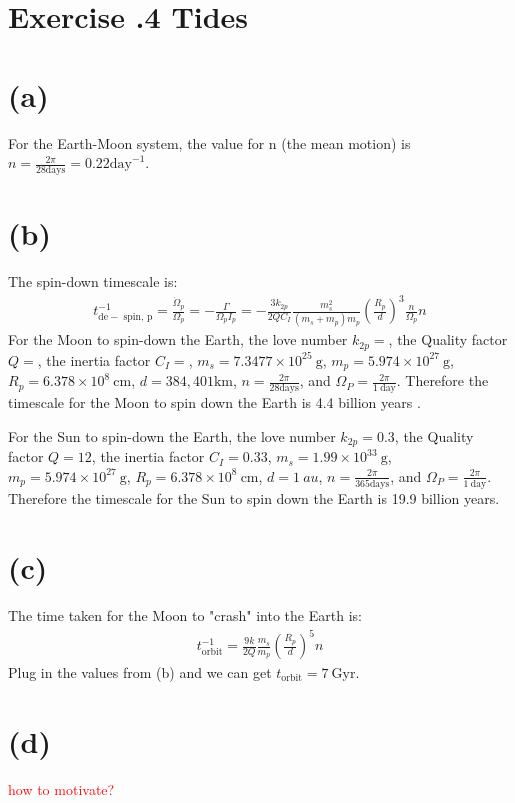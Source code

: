 \documentclass[a4paper,12pt]{article}
\newcommand{\cm}{\mathrm{cm}}
\newcommand{\g}{\mathrm{g}}
\begin{document}
\section*{\textbf{Exercise \uppercase\expandafter{}.4 Tides}}
\section*{(a)}
For the Earth-Moon system, the value for n (the mean motion) is $n = \frac{2\pi}{28 \text{days}} = 0.22 \text{day}^{-1}$.

\section*{(b)}
The spin-down timescale is:
\begin{align*}
    t_{\mathrm{de}-\text { spin, } \mathrm{p}}^{-1}=\frac{\dot{\Omega}_p}{\Omega_p}=-\frac{\Gamma}{\Omega_p I_p}=-\frac{3 k_{2 p}}{2 Q C_I} \frac{m_s^2}{\left(m_s+m_p\right) m_p}\left(\frac{R_p}{d}\right)^3 \frac{n}{\Omega_p} n
\end{align*}
For the Moon to spin-down the Earth, the love number $k_{2p} = $, the Quality factor $Q = $, 
the inertia factor $C_I = $, $m_s = 7.3477\times 10^{25} \ \g$, $m_p =5.974\times 10^{27} \ \g $, $R_p = 6.378\times 10^8 \ \cm$, $d = 384,401 \text{km}$, $n = \frac{2\pi}{28 \text{days}}$, and $\Omega_P = \frac{2\pi}{1 \ \text{day}}$. 
Therefore the timescale for the Moon to spin down the Earth is 4.4 billion years .

For the Sun to spin-down the Earth, the love number $k_{2p} = 0.3$, the Quality factor $Q = 12$, 
the inertia factor $C_I = 0.33$, $m_s = 1.99\times 10^{33}\ \g$, $m_p =5.974\times 10^{27} \ \g $, $R_p = 6.378\times 10^8 \ \cm$, $d = 1 \ au$, $n = \frac{2\pi}{365 \text{days}}$, and $\Omega_P = \frac{2\pi}{1 \ \text{day}}$.
Therefore the timescale for the Sun to spin down the Earth is 19.9 billion years.

\section*{(c)}
The time taken for the Moon to "crash" into the Earth is:
\begin{align*}
    t_{\text{orbit}}^{-1} = \frac{9k}{2Q} \frac{m_s}{m_p} (\frac{R_p}{d})^5 n
\end{align*}
Plug in the values from (b) and we can get $t_{\text{orbit}} = 7 \ \text{Gyr}$.

\section*{(d)}
\textcolor{red}{how to motivate?}
\end{document}
